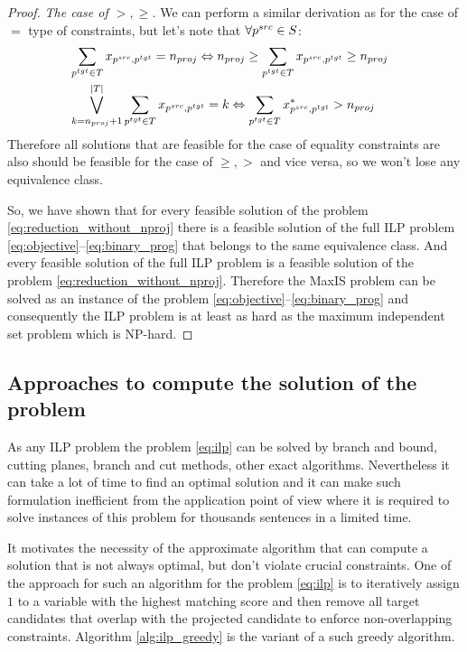\begin{proof}
  \textit{The case of \( >, \geq \).} We can perform a similar derivation as for the case of \( = \) type of constraints, but
  let's note that \( \forall p^{src} \in S \):
  \begin{align*}
    & \sum\limits_{p^{tgt} \in T} x_{p^{src}, p^{tgt}} = n_{proj} \Leftrightarrow
    n_{proj} \geq \sum\limits_{p^{tgt} \in T} x_{p^{src}, p^{tgt}} \geq n_{proj}                                  \\
    & \bigvee\limits_{k=n_{proj} + 1}^{|T|} \sum\limits_{p^{tgt} \in T} x_{p^{src}, p^{tgt}} = k \Leftrightarrow
    \sum\limits_{p^{tgt} \in T} x^*_{p^{src}, p^{tgt}} > n_{proj} \qquad
  \end{align*}
  Therefore all solutions that are feasible for the case of equality constraints are also should be
  feasible for the case of \( \geq, > \) and vice versa, so we won't lose any equivalence class.

  So, we have shown that for every feasible solution of the problem \eqref{eq:reduction_without_nproj} there is
  a feasible solution of the full ILP problem \eqref{eq:objective}--\eqref{eq:binary_prog} that belongs to the
  same equivalence class. And every feasible solution of the full ILP problem is a feasible solution of the problem \eqref{eq:reduction_without_nproj}.
  Therefore the MaxIS problem can be solved as an instance of the problem \eqref{eq:objective}--\eqref{eq:binary_prog}
  and consequently the ILP problem is at least as hard as the maximum independent set problem which is NP-hard.
\end{proof}

\subsection{Approaches to compute the solution of the problem}
As any ILP problem the problem \eqref{eq:ilp} can be solved by branch and bound, cutting planes,
branch and cut methods, other exact algorithms. Nevertheless it can take a lot of time to find an optimal solution and
it can make such formulation inefficient from the application point of view where it is required to
solve instances of this problem for thousands sentences in a limited time.

It motivates the necessity of the approximate algorithm that can compute a solution that is not always
optimal, but don't violate crucial constraints. One of the approach for such an algorithm for the problem
\eqref{eq:ilp} is to iteratively assign \( 1 \) to a variable with the highest matching score and then remove
all target candidates that overlap with the projected candidate to enforce non-overlapping constraints.
Algorithm \ref{alg:ilp_greedy} is the variant of a such greedy algorithm.

